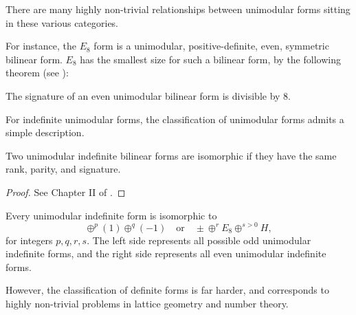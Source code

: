 There are many highly non-trivial relationships between unimodular forms sitting in these various categories.

\begin{example}
For instance, the $E_8$ form is a unimodular, positive-definite, even, symmetric bilinear form. 
$E_8$ has the smallest size for such a bilinear form, by the following theorem (see \cite{serre1961forms}):
\end{example}

\begin{theorem}
	The signature of an even unimodular bilinear form is divisible by $8$.
\end{theorem}

For indefinite unimodular forms, the classification of unimodular forms admits a simple description.

\begin{theorem}\label{thm:indefinite-bilinear-forms-isomorphic}
	Two unimodular indefinite bilinear forms are isomorphic if they have the same rank, parity, and signature.
\end{theorem}
\begin{proof}
	See Chapter II of \cite{milnorhuse1973forms}.
\end{proof}

\begin{corollary}
	Every unimodular indefinite form is isomorphic to
	\[
		\oplus^p (1)\oplus^q (-1)\quad\textrm{or}\quad \pm \oplus^r E_8 \oplus^{s>0} H,
	\]
	for integers $p,q,r,s$. The left side represents all possible odd unimodular indefinite forms, and the right side represents all even unimodular indefinite forms.
\end{corollary}

However, the classification of definite forms is far harder, and corresponds to highly non-trivial problems in lattice geometry and number theory.

\smallrule
